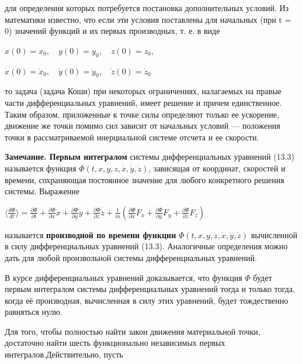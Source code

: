 {\begin{center}
\par для определения которых потребуется постановка дополнительных условий. Из  математики  известно,  что  если  эти  условия  поставлены  для  начальных (при t = 0) значений функций и их первых производных, т. е. в виде

\par $x(0) = x_{0}, \quad y(0) = y_{0}, \quad z(0) = z_{0},$
\par $\dot x(0) = \dot x_{0}, \quad \dot y(0) = \dot y_{0}, \quad \dot z(0) = \dot z_{0} $

\par то задача (задача Коши) при некоторых ограничениях, налагаемых на правые части дифференциальных уравнений, имеет решение и причем единственное. Таким образом, приложенные к точке силы определяют только ее ускорение, движение же точки помимо сил зависит от начальных условий — положения точки в рассматриваемой инерциальной системе отсчета и ее скорости.

\par \textbf{Замечание. Первым интегралом} системы дифференциальных уравнений (13.3) называется функция
 $ \Phi(t,x,y,z, \dot x, \dot y, \dot z)$, зависящая от координат, скоростей и времени, сохраняющая постоянное значение для любого конкретного решения системы. Выражение

\par $\langle \frac{d\Phi}{dt} \rangle = \frac{\partial\Phi}{\partial t} + \frac{\partial\Phi}{\partial x} \dot x + \frac{\partial\Phi}{\partial y} \dot y + \frac{\partial\Phi}{\partial z} \dot z + \frac{1}{m}(\frac{\partial\Phi}{\partial \dot x}F_{x} + \frac{\partial\Phi}{\partial \dot y}F_{y} + \frac{\partial\Phi}{\partial \dot z}F_{z})$

\par называется \textbf{производной по времени функции} $ \Phi(t,x,y,z, \dot x, \dot y, \dot z)$ вычисленной в силу дифференциальных уравнений (13.3). Аналогичные определения можно дать для любой произвольной системы дифференциальных уравнений.

\par В курсе дифференциальных уравнений доказывается, что функция $\Phi$ будет первым интегралом системы дифференциальных уравнений тогда и только тогда, когда её производная, вычисленная в силу этих уравнений, будет тождественно равняться нулю.

\par Для того, чтобы полностью найти закон движения материальной точки, достаточно найти шесть функционально независимых первых интегралов.Действительно, пусть


\end{center}}
